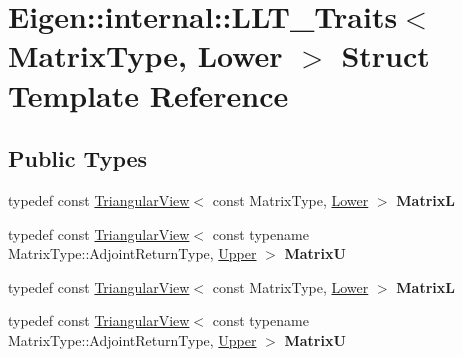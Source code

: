 \hypertarget{struct_eigen_1_1internal_1_1_l_l_t___traits_3_01_matrix_type_00_01_lower_01_4}{}\section{Eigen\+:\+:internal\+:\+:L\+L\+T\+\_\+\+Traits$<$ Matrix\+Type, Lower $>$ Struct Template Reference}
\label{struct_eigen_1_1internal_1_1_l_l_t___traits_3_01_matrix_type_00_01_lower_01_4}
\subsection*{Public Types}
\begin{DoxyCompactItemize}
\item 
\mbox{\label{struct_eigen_1_1internal_1_1_l_l_t___traits_3_01_matrix_type_00_01_lower_01_4_a66962242a7b894516b50903e48eaa502}} 
typedef const \hyperlink{group___core___module_class_eigen_1_1_triangular_view}{Triangular\+View}$<$ const Matrix\+Type, \hyperlink{group__enums_gga39e3366ff5554d731e7dc8bb642f83cda891792b8ed394f7607ab16dd716f60e6}{Lower} $>$ {\bfseries MatrixL}
\item 
\mbox{\label{struct_eigen_1_1internal_1_1_l_l_t___traits_3_01_matrix_type_00_01_lower_01_4_a594ab80db6d0871384036e44409c84fd}} 
typedef const \hyperlink{group___core___module_class_eigen_1_1_triangular_view}{Triangular\+View}$<$ const typename Matrix\+Type\+::\+Adjoint\+Return\+Type, \hyperlink{group__enums_gga39e3366ff5554d731e7dc8bb642f83cda6bcb58be3b8b8ec84859ce0c5ac0aaec}{Upper} $>$ {\bfseries MatrixU}
\item 
\mbox{\label{struct_eigen_1_1internal_1_1_l_l_t___traits_3_01_matrix_type_00_01_lower_01_4_a66962242a7b894516b50903e48eaa502}} 
typedef const \hyperlink{group___core___module_class_eigen_1_1_triangular_view}{Triangular\+View}$<$ const Matrix\+Type, \hyperlink{group__enums_gga39e3366ff5554d731e7dc8bb642f83cda891792b8ed394f7607ab16dd716f60e6}{Lower} $>$ {\bfseries MatrixL}
\item 
\mbox{\label{struct_eigen_1_1internal_1_1_l_l_t___traits_3_01_matrix_type_00_01_lower_01_4_a594ab80db6d0871384036e44409c84fd}} 
typedef const \hyperlink{group___core___module_class_eigen_1_1_triangular_view}{Triangular\+View}$<$ const typename Matrix\+Type\+::\+Adjoint\+Return\+Type, \hyperlink{group__enums_gga39e3366ff5554d731e7dc8bb642f83cda6bcb58be3b8b8ec84859ce0c5ac0aaec}{Upper} $>$ {\bfseries MatrixU}
\end{DoxyCompactItemize}

